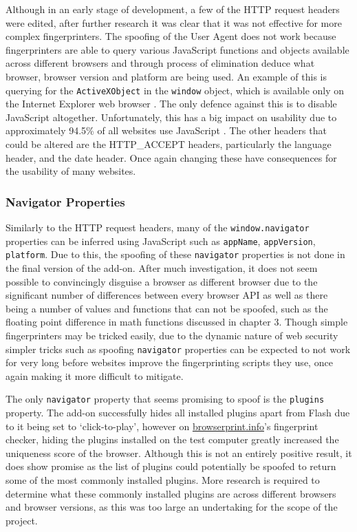 Although in an early stage of development, a few of the HTTP request headers were edited, after further research it was clear that it was not effective for more complex fingerprinters.
The spoofing of the User Agent does not work because fingerprinters are able to query various JavaScript functions and objects available across different browsers and through process of elimination deduce what browser, browser version and platform are being used.
An example of this is querying for the \texttt{ActiveXObject} in the \texttt{window} object, which is available only on the Internet Explorer web browser \citep{activeX}.
The only defence against this is to disable JavaScript altogether.
Unfortunately, this has a big impact on usability due to approximately 94.5\% of all websites use JavaScript \citep{w3-javascript}.
The other headers that could be altered are the HTTP\_ACCEPT headers, particularly the language header, and the date header.
Once again changing these have consequences for the usability of many websites.

\subsubsection{Navigator Properties}

Similarly to the HTTP request headers, many of the \texttt{window.navigator} properties can be inferred using JavaScript such as \texttt{appName}, \texttt{appVersion}, \texttt{platform}.
Due to this, the spoofing of these \texttt{navigator} properties is not done in the final version of the add-on.
After much investigation, it does not seem possible to convincingly disguise a browser as different browser due to the significant number of differences between every browser API as well as there being a number of values and functions that can not be spoofed, such as the floating point difference in math functions discussed in chapter 3.
Though simple fingerprinters may be tricked easily, due to the dynamic nature of web security simpler tricks such as spoofing \texttt{navigator} properties can be expected to not work for very long before websites improve the fingerprinting scripts they use, once again making it more difficult to mitigate.

The only \texttt{navigator} property that seems promising to spoof is the \texttt{plugins} property.
The add-on successfully hides all installed plugins apart from Flash due to it being set to `click-to-play', however on \url{browserprint.info}'s fingerprint checker, hiding the plugins installed on the test computer greatly increased the uniqueness score of the browser.
Although this is not an entirely positive result, it does show promise as the list of plugins could potentially be spoofed to return some of the most commonly installed plugins.
More research is required to determine what these commonly installed plugins are across different browsers and browser versions, as this was too large an undertaking for the scope of the project.

